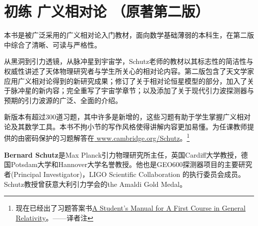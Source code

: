 \chapter*{初练  广义相对论 （原著第二版）}
本书是被广泛采用的广义相对论入门教材，面向数学基础薄弱的本科生，在第二版中综合了清晰、可读与严格性。

从黑洞到引力透镜，从脉冲星到宇宙学，Schutz老师的教材以其标志性的简洁性与权威性讲述了天体物理研究者与学生所关心的相对论内容。第二版包含了天文学家应用广义相对论得到的新研究成果；修订了关于相对论恒星模型的部分，加入了关于脉冲星的新内容；完全重写了宇宙学章节；以及添加了关于现代引力波探测器与预期的引力波源的广泛、全面的介绍。


新版本有超过300道习题，其中许多是新增的，这些习题有助于学生掌握广义相对论及其数学工具。本书不拘小节的写作风格使得讲解内容更加易懂。为任课教师提供的由密码保护的习题解答在\url{ www.cambridge.org/Schutz}。\footnote{现在已经出了习题答案书\href{https://www.amazon.com/Students-Manual-Course-General-Relativity/dp/1107638577/ref=pd_lpo_sbs_14_t_1/132-1792890-1442646?_encoding=UTF8&psc=1&refRID=6QENKEJ7D1JWQ80H021W}{A Student's Manual for A First Course in General Relativity}。——译者注}


\textbf{Bernard Schutz}是Max Planck引力物理研究所主任，英国Cardiff大学教授，德国Potsdam大学和Hannover大学名誉教授。他也是GEO600探测器项目的主要研究者(Principal Investigator)，LIGO Scientific Collaboration 的执行委员会成员。Schutz教授曾获意大利引力学会的the Amaldi Gold Medal。